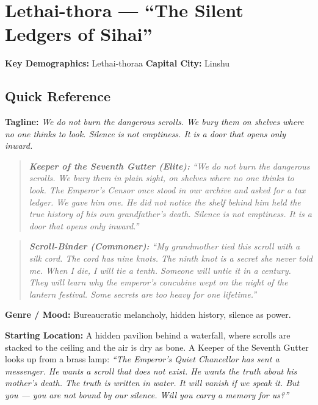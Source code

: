 \section{Lethai-thora --- ``The Silent Ledgers of Sihai''}
\label{chap:lethai-thora}

\textbf{Key Demographics: } Lethai-thoraa
\textbf{Capital City: } Linshu

\subsection*{Quick Reference}
\textbf{Tagline:} \textit{We do not burn the dangerous scrolls. We bury them on shelves where no one thinks to look. Silence is not emptiness. It is a door that opens only inward.}

\begin{quote}
  \textbf{\textit{Keeper of the Seventh Gutter (Elite):}}  
  \textit{``We do not burn the dangerous scrolls. We bury them in plain sight, on shelves where no one thinks to look. The Emperor's Censor once stood in our archive and asked for a tax ledger. We gave him one. He did not notice the shelf behind him held the true history of his own grandfather's death. Silence is not emptiness. It is a door that opens only inward.''}
\end{quote}

\begin{quote}
  \textbf{\textit{Scroll-Binder (Commoner):}}  
  \textit{``My grandmother tied this scroll with a silk cord. The cord has nine knots. The ninth knot is a secret she never told me. When I die, I will tie a tenth. Someone will untie it in a century. They will learn why the emperor's concubine wept on the night of the lantern festival. Some secrets are too heavy for one lifetime.''}
\end{quote}

\textbf{Genre / Mood:} Bureaucratic melancholy, hidden history, silence as power.

\textbf{Starting Location:} A hidden pavilion behind a waterfall, where scrolls are stacked to the ceiling and the air is dry as bone. A Keeper of the Seventh Gutter looks up from a brass lamp: \textit{``The Emperor's Quiet Chancellor has sent a messenger. He wants a scroll that does not exist. He wants the truth about his mother's death. The truth is written in water. It will vanish if we speak it. But you --- you are not bound by our silence. Will you carry a memory for us?''}

